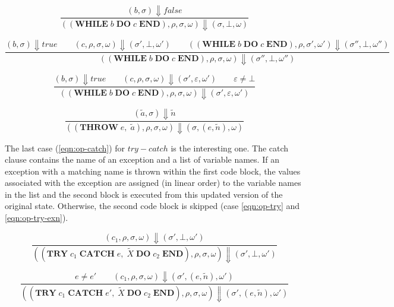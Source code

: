 \begin{equation}
\frac{(b, \sigma) \Downarrow false}{((\textbf{WHILE}\; b\; \textbf{DO}\; c\; \textbf{END}), \rho, \sigma, \omega) \Downarrow (\sigma, \bot, \omega)}
\end{equation}

\begin{equation}
\frac{(b, \sigma) \Downarrow true \qquad (c, \rho, \sigma, \omega) \Downarrow (\sigma', \bot, \omega') \qquad ((\textbf{WHILE}\; b\; \textbf{DO}\; c\; \textbf{END}), \rho, \sigma', \omega') \Downarrow (\sigma'', \bot, \omega'')}{((\textbf{WHILE}\; b\; \textbf{DO}\; c\; \textbf{END}), \rho, \sigma, \omega) \Downarrow (\sigma'', \bot, \omega'')}
\end{equation}

\begin{equation}\label{eqn:op-while-exn}
\frac{(b, \sigma) \Downarrow true \qquad (c, \rho, \sigma, \omega) \Downarrow (\sigma', \varepsilon, \omega') \qquad \varepsilon \neq \bot}{((\textbf{WHILE}\; b\; \textbf{DO}\; c\; \textbf{END}), \rho, \sigma, \omega) \Downarrow (\sigma', \varepsilon, \omega')}
\end{equation}

\begin{equation}\label{eqn:op-throw}
\frac{(\tilde{a}, \sigma) \Downarrow \tilde{n}}{((\textbf{THROW}\; e,\; \tilde{a}), \rho, \sigma, \omega) \Downarrow (\sigma, (e, \tilde{n}), \omega)}
\end{equation}

The last case (\ref{eqn:op-catch}) for $try-catch$ is the interesting one. The catch clause contains the name of an exception and a list of variable names. If an exception with a matching name is thrown within the first code block, the values associated with the exception are assigned (in linear order) to the variable names in the list and the second block is executed from this updated version of the original state. Otherwise, the second code block is skipped (case \ref{eqn:op-try} and \ref{eqn:op-try-exn}).

\begin{equation}\label{eqn:op-try}
\frac{(c_1, \rho, \sigma, \omega) \Downarrow (\sigma', \bot, \omega')}{((\textbf{TRY}\; c_1\; \textbf{CATCH}\; e,\; \tilde{X}\; \textbf{DO}\; c_2\; \textbf{END}), \rho, \sigma, \omega) \Downarrow (\sigma', \bot, \omega')}
\end{equation}

\begin{equation}\label{eqn:op-try-exn}
\frac{e \neq e' \qquad (c_1, \rho, \sigma, \omega) \Downarrow (\sigma', (e, \tilde{n}), \omega')}{((\textbf{TRY}\; c_1\; \textbf{CATCH}\; e',\; \tilde{X}\; \textbf{DO}\; c_2\; \textbf{END}), \rho, \sigma, \omega) \Downarrow (\sigma', (e, \tilde{n}), \omega')}
\end{equation}

